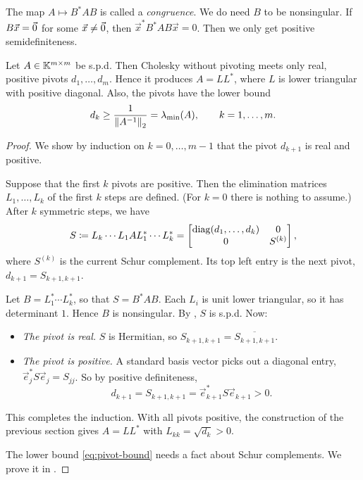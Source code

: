 The map $A \mapsto B^\ast AB$ is called a \emph{congruence}. We do need $B$ to be nonsingular. If $B\vec{x} = \vec{0}$ for some $\vec{x} \ne \vec{0}$, then $\vec{x}^\ast B^\ast AB\vec{x} = 0$. Then we only get positive semidefiniteness.

\begin{theorem}
  \label{thm:chol-exists}
  Let $A \in \mathbb{K}^{m \times m}$ be s.p.d. Then Cholesky without pivoting meets only real, positive pivots $d_1, \dots, d_m$. Hence it produces $A = LL^\ast$, where $L$ is lower triangular with positive diagonal. Also, the pivots have the lower bound
  \begin{equation}
    \label{eq:pivot-bound}
    d_k \ge \frac{1}{\left\lVert A^{-1} \right\rVert_2} = \lambda_{\min}(A), \qquad k = 1, \dots, m.
  \end{equation}
\end{theorem}

\begin{proof}
  We show by induction on $k = 0, \dots, m - 1$ that the pivot $d_{k+1}$ is real and positive.

  Suppose that the first $k$ pivots are positive. Then the elimination matrices $L_1, \dots, L_k$ of the first $k$ steps are defined. (For $k = 0$ there is nothing to assume.) After $k$ symmetric steps, we have
  \begin{equation}
    S \coloneqq L_k \cdots L_1AL_1^\ast \cdots L_k^\ast = \begin{bmatrix} \operatorname{diag}(d_1, \dots, d_k) & 0 \\ 0 & S^{(k)} \end{bmatrix},
  \end{equation}
  where $S^{(k)}$ is the current Schur complement. Its top left entry is the next pivot, $d_{k+1} = S_{k+1,k+1}$.

  Let $B = L_1^\ast \cdots L_k^\ast$, so that $S = B^\ast AB$. Each $L_i$ is unit lower triangular, so it has determinant $1$. Hence $B$ is nonsingular. By , $S$ is s.p.d. Now:
  \begin{itemize}
    \item \emph{The pivot is real.} $S$ is Hermitian, so $S_{k+1,k+1} = \overline{S_{k+1,k+1}}$.
    \item \emph{The pivot is positive.} A standard basis vector picks out a diagonal entry, $\vec{e}_j^\ast S\vec{e}_j = S_{jj}$. So by positive definiteness,
    \begin{equation}
      d_{k+1} = S_{k+1,k+1} = \vec{e}_{k+1}^\ast S\vec{e}_{k+1} > 0.
    \end{equation}
  \end{itemize}
  This completes the induction. With all pivots positive, the construction of the previous section gives $A = LL^\ast$ with $L_{kk} = \sqrt{d_k} > 0$.

  The lower bound \eqref{eq:pivot-bound} needs a fact about Schur complements. We prove it in .
\end{proof}

